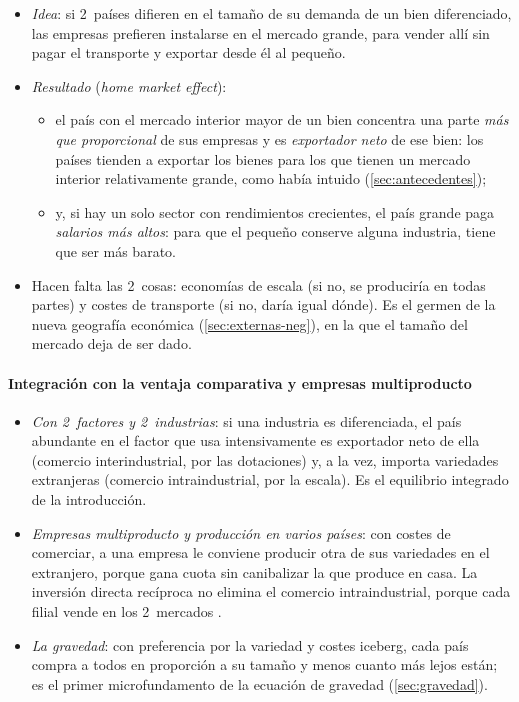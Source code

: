 \documentclass[11pt]{article}
\begin{document}
\begin{itemize}
\item \emph{Idea}: si 2~países difieren en el tamaño de su demanda de un bien diferenciado, las empresas prefieren instalarse en el mercado grande, para vender allí sin pagar el transporte y exportar desde él al pequeño.
\item \emph{Resultado} (\emph{home market effect}):
  \begin{itemize}
  \item el país con el mercado interior mayor de un bien concentra una parte \emph{más que proporcional} de sus empresas y es \emph{exportador neto} de ese bien: los países tienden a exportar los bienes para los que tienen un mercado interior relativamente grande, como había intuido \textcite{Linder1961Essay} (\ref{sec:antecedentes});
  \item y, si hay un solo sector con rendimientos crecientes, el país grande paga \emph{salarios más altos}: para que el pequeño conserve alguna industria, tiene que ser más barato\nocite{Krugman1980Scale}.
  \end{itemize}
\item Hacen falta las 2~cosas: economías de escala (si no, se produciría en todas partes) y costes de transporte (si no, daría igual dónde). Es el germen de la nueva geografía económica (\ref{sec:externas-neg}), en la que el tamaño del mercado deja de ser dado.
\end{itemize}

\paragraph{Integración con la ventaja comparativa y empresas multiproducto}

\begin{itemize}
\item \emph{Con 2~factores y 2~industrias}\nocite{HelpmanKrugman1985Market}: si una industria es diferenciada, el país abundante en el factor que usa intensivamente es exportador neto de ella (comercio interindustrial, por las dotaciones) y, a la vez, importa variedades extranjeras (comercio intraindustrial, por la escala). Es el equilibrio integrado de la introducción.
\item \emph{Empresas multiproducto y producción en varios países}\nocite{BaldwinOttaviano2001Multiproduct}: con costes de comerciar, a una empresa le conviene producir otra de sus variedades en el extranjero, porque gana cuota sin canibalizar la que produce en casa. La inversión directa recíproca no elimina el comercio intraindustrial, porque cada filial vende en los 2~mercados .
\item \emph{La gravedad}: con preferencia por la variedad y costes iceberg, cada país compra a todos en proporción a su tamaño y menos cuanto más lejos están; es el primer microfundamento de la ecuación de gravedad (\ref{sec:gravedad}).
\end{itemize}
\end{document}
